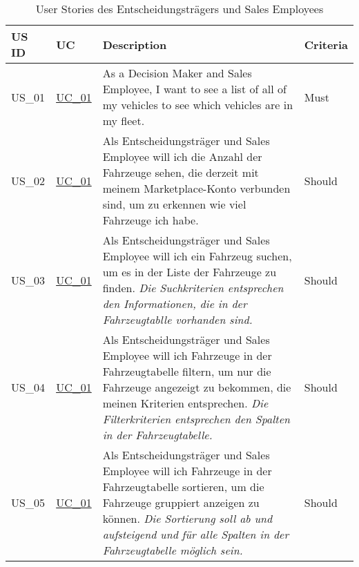   \sffamily
  \begin{footnotesize}
    \begin{longtable}[L L L L]{ p{} p{} p{} p{}}
      \caption                       %
          {User Stories des Entscheidungsträgers und Sales Employees} %
          \\
      \toprule
      \textbf{US ID} & \textbf{UC} & \textbf{Description} & \textbf{Criteria} \\
      \midrule

      \hypertarget{Ref:US1}{US\_01} & \hyperlink{Ref:UC1}{UC\_01} & As a Decision Maker and Sales Employee, I want to see a list of all of my vehicles to see which vehicles are in my fleet. & Must \\ 

      \hypertarget{Ref:US2}{US\_02} & \hyperlink{Ref:UC1}{UC\_01} & Als Entscheidungsträger und Sales Employee will ich die Anzahl der Fahrzeuge sehen, die derzeit mit meinem Marketplace-Konto verbunden sind, um zu erkennen wie viel Fahrzeuge ich habe. & Should \\

      \hypertarget{Ref:US3}{US\_03} & \hyperlink{Ref:UC1}{UC\_01} & Als Entscheidungsträger und Sales Employee will ich ein Fahrzeug suchen, um es in der Liste der Fahrzeuge zu finden.
      \newline\newline
      \emph{Die Suchkriterien entsprechen den Informationen, die in der Fahrzeugtablle vorhanden sind.} & Should
      \\

      \hypertarget{Ref:US4}{US\_04} & \hyperlink{Ref:UC1}{UC\_01} & Als Entscheidungsträger und Sales Employee will ich Fahrzeuge in der Fahrzeugtabelle filtern, um nur die Fahrzeuge angezeigt zu bekommen, die meinen Kriterien entsprechen.
      \newline\newline
      \emph{Die Filterkriterien entsprechen den Spalten in der Fahrzeugtabelle.}
      & Should
      \\

      \hypertarget{Ref:US5}{US\_05} & \hyperlink{Ref:UC1}{UC\_01} & Als Entscheidungsträger und Sales Employee will ich Fahrzeuge in der Fahrzeugtabelle sortieren, um die Fahrzeuge gruppiert anzeigen zu können. 
      \newline\newline
      \emph{Die Sortierung soll ab und aufsteigend und für alle Spalten in der Fahrzeugtabelle möglich sein.}
      & Should
      \\


\end{longtable}
\end{footnotesize}
